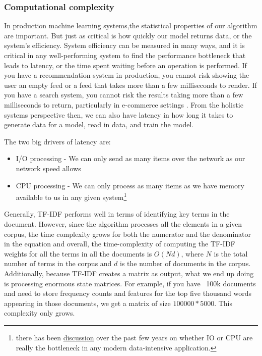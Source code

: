 \documentclass[11pt, table]{diazessay} %
\begin{document}
\begin{sloppypar}
\subsubsection{Computational complexity}
  
In production machine learning systems,the statistical properties of our algorithm are important. But just as critical is how quickly our model returns data, or the system's efficiency. System efficiency can be measured in many ways, and it is critical in any well-performing system to find the performance bottleneck that leads to latency, or the time spent waiting before an operation is  performed\citep{gregg2014systems}. If you have a recommendation system in production, you cannot risk showing the user an empty feed or a feed that takes more than a few milliseconds to render. If you have a search system, you cannot risk the results taking more than a few milliseconds to return, particularly in e-commerce settings \cite{arapakis2014impact}.  From the holistic systems perspective then, we can also have latency in how long it takes to generate data for a model, read in data, and train the model. 

The two big drivers of latency are: 

\begin{itemize}
  \item I/O processing - We can only send as many items over the network as our network speed allows
  \item CPU processing - We can only process as many items as we have memory available to us in any given system\footnote{there has been \href{https://benhoyt.com/writings/io-is-no-longer-the-bottleneck/}{discussion} over the past few years on whether IO or CPU are really the bottleneck in any modern data-intensive application.}
\end{itemize}


Generally, TF-IDF performs well in terms of identifying key terms in the document. However, since the algorithm processes all the elements in a given corpus, the time complexity grows for both the numerator and the denominator in the equation and overall, the time-complexity of computing the TF-IDF weights for all the terms in all the documents is $O(Nd)$, where $N$ is the total number of terms in the corpus and $d$ is the number of documents in the corpus. Additionally, because TF-IDF creates a matrix as output, what we end up doing is processing enormous state matrices. For example, if you have ~100k documents and need to store frequency counts and features for the top five thousand words appearing in those documents, we get a matrix of size $100000*5000$. This complexity only grows.


\end{sloppypar}
\end{document}
